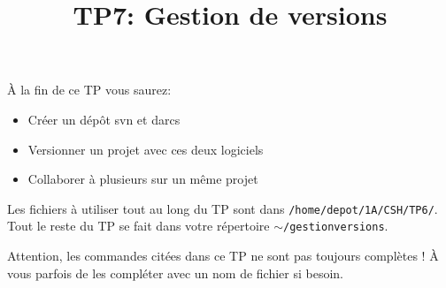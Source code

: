 \documentclass[10pt]{article}\usepackage[nu]{esial}
\begin{document}
\title{TP7: Gestion de versions}
\maketitle

\newcommand{\I}{\hspace{1.5em}}

À la fin de ce TP vous saurez:
\begin{itemize}
\item Créer un dépôt svn et darcs
\item Versionner un projet avec ces deux logiciels
\item Collaborer à plusieurs sur un même projet
\end{itemize}
\bigskip

Les fichiers à utiliser tout au long du TP sont dans {\tt /home/depot/1A/CSH/TP6/}.
Tout le reste du TP se fait dans votre répertoire {\tt $\sim$/gestionversions}.

Attention, les commandes citées dans ce TP ne sont pas toujours complètes ! À vous parfois
de les compléter avec un nom de fichier si besoin.
\end{document}

